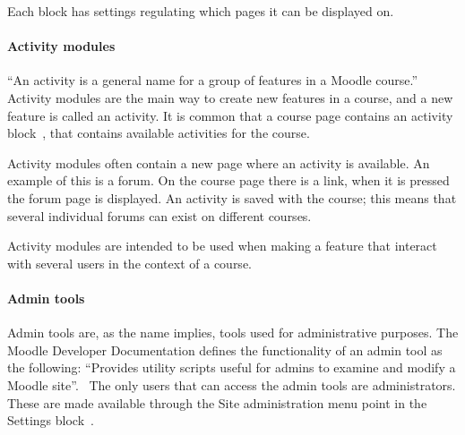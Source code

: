 Each block has settings regulating which pages it can be displayed on. %




\paragraph{Activity modules}
\label{par:activitymodules}
``An activity is a general name for a group of features in a Moodle course.''~\cite{activity} 
Activity modules are the main way to create new features in a course, and a new feature is called an activity. 
It is common that a course page contains an activity block~\cite{activityblock}, that contains available activities for the course. 

Activity modules often contain a new page where an activity is available. 
An example of this is a forum. 
On the course page there is a link, when it is pressed the forum page is displayed. 
An activity is saved with the course; this means that several individual forums can exist on different courses.

Activity modules are intended to be used when making a feature that interact with several users in the context of a course.  

\paragraph{Admin tools}
\label{par:admintool}
Admin tools are, as the name implies, tools used for administrative purposes. 
The Moodle Developer Documentation defines the functionality of an admin tool as the following: 
``Provides utility scripts useful for admins to examine and modify a Moodle site''.~\cite{plugin} 
The only users that can access the admin tools are administrators. 
These are made available through the Site administration menu point in the Settings block~\cite{moodleadmintools}.


